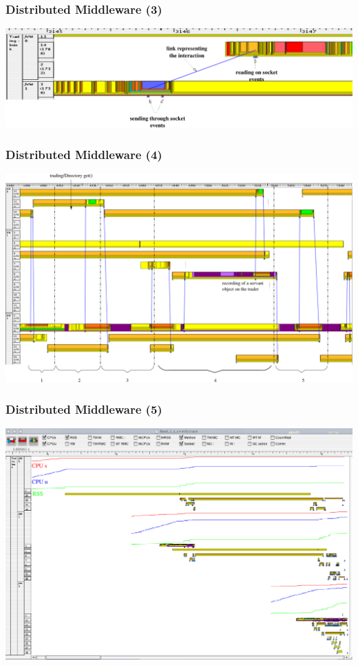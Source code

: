 \begin{frame}
\frametitle{Distributed Middleware (3)}
\includegraphics[width=\textwidth]{figures/RepCommPaje.pdf}
\end{frame}
\begin{frame}
\frametitle{Distributed Middleware (4)}
\includegraphics[width=\textwidth]{figures/Book-2.pdf}
\end{frame}
\begin{frame}
\frametitle{Distributed Middleware (5)}
\includegraphics[width=\textwidth]{figures/BookInfoSys.pdf}

\end{frame}
